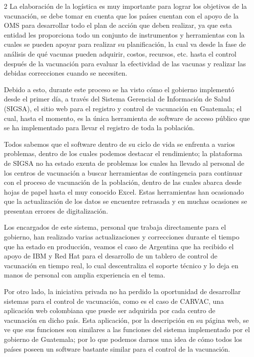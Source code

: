 \documentclass[12pt,spanish,Letterpaper,openany]{book}
\begin{document}
\begin {multicols}{2}
La elaboración de la logística es muy importante para lograr los objetivos de la vacunación, se debe tomar en cuenta que los países cuentan con el apoyo de la OMS para desarrollar todo el plan de acción que deben realizar, ya que esta entidad les proporciona todo un conjunto de instrumentos y herramientas con la cuales se pueden apoyar para realizar su planificación, la cual va desde la fase de análisis de qué vacunas pueden adquirir, costos, recursos, etc. hasta el control después de la vacunación para evaluar la efectividad de las vacunas y realizar las debidas correcciones cuando se necesiten.

Debido a esto, durante este proceso se ha visto cómo el gobierno implementó desde el primer día, a través del Sistema Gerencial de Información de Salud (SIGSA), el sitio web para el registro y control de vacunación en Guatemala; el cual, hasta el momento, es la única herramienta de software de acceso público que se ha implementado para llevar el registro de toda la población.

Todos sabemos que el software dentro de su ciclo de vida se enfrenta a varios problemas, dentro de los cuales podemos destacar el rendimiento; la plataforma de SIGSA no ha estado exenta de problemas los cuales ha llevado al personal de los centros de vacunación a buscar herramientas de contingencia para continuar con el proceso de vacunación de la población, dentro de las cuales abarca desde hojas de papel hasta el muy conocido Excel. Estas herramientas han ocasionado que la actualización de los datos se encuentre retrasada y en muchas ocasiones se presentan errores de digitalización.

Los encargados de este sistema, personal que trabaja directamente para el gobierno, han realizado varias actualizaciones y correcciones durante el tiempo que ha estado en producción, veamos el caso de Argentina que ha recibido el apoyo de IBM y Red Hat para el desarrollo de un tablero de control de vacunación en tiempo real, lo cual descentraliza el soporte técnico y lo deja en manos de personal con amplia experiencia en el tema.

Por otro lado, la iniciativa privada no ha perdido la oportunidad de desarrollar sistemas para el control de vacunación, como es el caso de CARVAC, una aplicación web colombiana que puede ser adquirida por cada centro de vacunación en dicho país. Esta aplicación, por la descripción en su página web, se ve que sus funciones son similares a las funciones del sistema implementado por el gobierno de Guatemala; por lo que podemos darnos una idea de cómo todos los países poseen un software bastante similar para el control de la vacunación.


\end{multicols}
\end{document}
